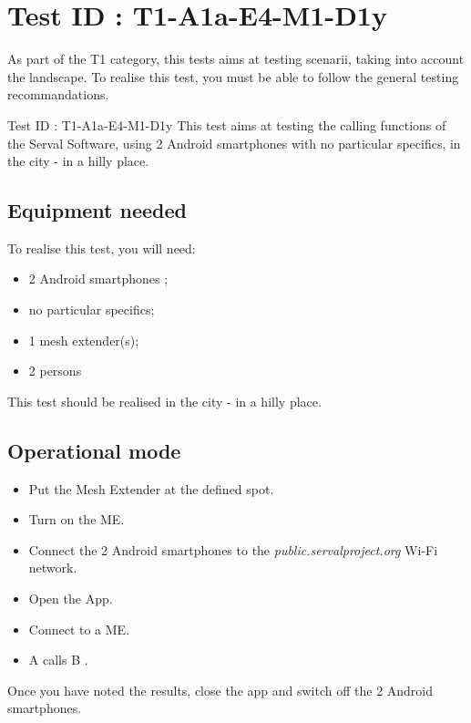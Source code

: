 \documentclass[oneside]{book}
\begin{document}
\section{Test ID : T1-A1a-E4-M1-D1y}
\begin{itshape}
As part of the T1 category, this tests aims at testing scenarii, taking into account the landscape. 
To realise this test, you must be able to follow the general testing recommandations.
\end{itshape}
\newline
Test ID : T1-A1a-E4-M1-D1y
 This test aims at testing the calling functions of the Serval Software, using 2 Android smartphones with no particular specifics, in the city - in a hilly place.
\subsection{Equipment needed} To realise this test, you will need:
\begin{itemize}
\item 2 Android smartphones ;
\item no particular specifics;
\item 1 mesh extender(s);
\item 2 persons
\end{itemize}
This test should be realised in the city - in a hilly place.
\subsection{Operational mode} \begin{itemize}
\item Put the Mesh Extender at the defined spot.
\item Turn on the ME.
\item Connect the 2 Android smartphones to the \emph{public.servalproject.org} Wi-Fi network.
\item Open the App.
\item Connect to a ME.
\item A calls B .
\end{itemize}
Once you have noted the results, close the app and switch off the 2 Android smartphones.
\end{document}
